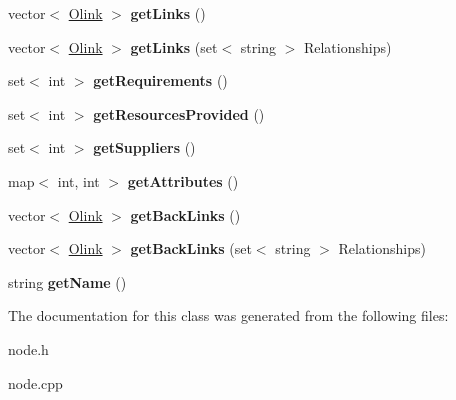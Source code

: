 \begin{DoxyCompactItemize}
\item 
\hypertarget{classNode_aaae84ab680d5baecaead90c1b13d93b6}{vector$<$ \hyperlink{classOlink}{\-Olink} $>$ {\bfseries get\-Links} ()}\label{classNode_aaae84ab680d5baecaead90c1b13d93b6}

\item 
\hypertarget{classNode_a383296d7c542abad583a858c485cd251}{vector$<$ \hyperlink{classOlink}{\-Olink} $>$ {\bfseries get\-Links} (set$<$ string $>$ \-Relationships)}\label{classNode_a383296d7c542abad583a858c485cd251}

\item 
\hypertarget{classNode_ad257abbc45dd066639d3f5191a26a823}{set$<$ int $>$ {\bfseries get\-Requirements} ()}\label{classNode_ad257abbc45dd066639d3f5191a26a823}

\item 
\hypertarget{classNode_afa7452c064bfa2e1afa2735553e69afc}{set$<$ int $>$ {\bfseries get\-Resources\-Provided} ()}\label{classNode_afa7452c064bfa2e1afa2735553e69afc}

\item 
\hypertarget{classNode_a7e0041a3a50b602af1f5ef6d1da68774}{set$<$ int $>$ {\bfseries get\-Suppliers} ()}\label{classNode_a7e0041a3a50b602af1f5ef6d1da68774}

\item 
\hypertarget{classNode_ad852f9fe476b5f619f58cf5591682906}{map$<$ int, int $>$ {\bfseries get\-Attributes} ()}\label{classNode_ad852f9fe476b5f619f58cf5591682906}

\item 
\hypertarget{classNode_a486784e375d7e75ff1a28211135b9968}{vector$<$ \hyperlink{classOlink}{\-Olink} $>$ {\bfseries get\-Back\-Links} ()}\label{classNode_a486784e375d7e75ff1a28211135b9968}

\item 
\hypertarget{classNode_a9cb0e97112ee1ec9e499f8b664c4c781}{vector$<$ \hyperlink{classOlink}{\-Olink} $>$ {\bfseries get\-Back\-Links} (set$<$ string $>$ \-Relationships)}\label{classNode_a9cb0e97112ee1ec9e499f8b664c4c781}

\item 
\hypertarget{classNode_ac5298373555f67634e27e5c739e7c94b}{string {\bfseries get\-Name} ()}\label{classNode_ac5298373555f67634e27e5c739e7c94b}

\end{DoxyCompactItemize}


\-The documentation for this class was generated from the following files\-:\begin{DoxyCompactItemize}
\item 
node.\-h\item 
node.\-cpp\end{DoxyCompactItemize}
